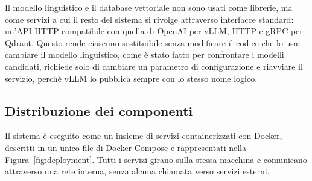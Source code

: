 Il modello linguistico e il database vettoriale non sono usati come librerie, ma come servizi a cui il resto del
sistema si rivolge attraverso interfacce standard: un'API HTTP compatibile con quella di OpenAI per vLLM, HTTP e
gRPC per Qdrant. Questo rende ciascuno sostituibile senza modificare il codice che lo usa: cambiare il modello
linguistico, come è stato fatto per confrontare i modelli candidati, richiede solo di cambiare un
parametro di configurazione e riavviare il servizio, perché vLLM lo pubblica sempre con lo stesso nome logico.

\subsection{Distribuzione dei componenti}

Il sistema è eseguito come un insieme di servizi containerizzati con Docker, descritti in un unico file di Docker
Compose e rappresentati nella Figura~\ref{fig:deployment}. Tutti i servizi girano sulla stessa macchina e comunicano
attraverso una rete interna, senza alcuna chiamata verso servizi esterni.

